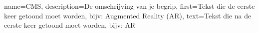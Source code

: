 \makenoidxglossaries

{
    name={CMS},
    description={De omschrijving van je begrip},
    first={Tekst die de eerste keer getoond moet worden, bijv: Augmented Reality (AR)},
    text={Tekst die na de eerste keer getoond moet worden, bijv: AR}
}
